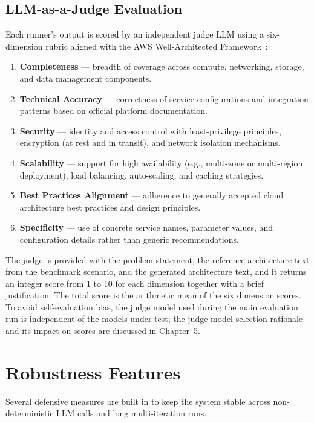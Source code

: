 \subsection{LLM-as-a-Judge Evaluation}
\label{subsec:judge_rubric}

Each runner's output is scored by an independent judge LLM using a six-dimension rubric aligned with the AWS Well-Architected Framework~\cite{aws2023wellarchitected}:

\begin{enumerate}
    \item \textbf{Completeness} — breadth of coverage across compute, networking, storage, and data management components.
    \item \textbf{Technical Accuracy} — correctness of service configurations and integration patterns based on official platform documentation.
    \item \textbf{Security} — identity and access control with least-privilege principles, encryption (at rest and in transit), and network isolation mechanisms.
    \item \textbf{Scalability} — support for high availability (e.g., multi-zone or multi-region deployment), load balancing, auto-scaling, and caching strategies.
    \item \textbf{Best Practices Alignment} — adherence to generally accepted cloud architecture best practices and design principles.
    \item \textbf{Specificity} — use of concrete service names, parameter values, and configuration details rather than generic recommendations.
\end{enumerate}

The judge is provided with the problem statement, the reference architecture text from the benchmark scenario, and the generated architecture text, and it returns an integer score from 1 to 10 for each dimension together with a brief justification. The total score is the arithmetic mean of the six dimension scores. To avoid self-evaluation bias, the judge model used during the main evaluation run is independent of the models under test; the judge model selection rationale and its impact on scores are discussed in Chapter~5.

\section{Robustness Features}

Several defensive measures are built in to keep the system stable across non-deterministic LLM calls and long multi-iteration runs.

